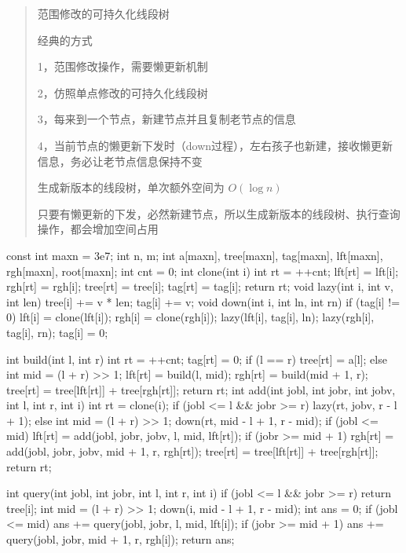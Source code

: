 \documentclass[UTF8,a4paper,11pt]{ctexart}
\newcommand{\topic}[1]{%
  \par\needspace{3\baselineskip}\vspace{0.45em}%
  \noindent{\bfseries\color{Primary}#1}\par\vspace{0.12em}%
}
\begin{document}
\topic{范围修改主席树}

\begin{quote}
范围修改的可持久化线段树\par
经典的方式\par
1，范围修改操作，需要懒更新机制\par
2，仿照单点修改的可持久化线段树\par
3，每来到一个节点，新建节点并且复制老节点的信息\par
4，当前节点的懒更新下发时（down过程），左右孩子也新建，接收懒更新信息，务必让老节点信息保持不变\par
生成新版本的线段树，单次额外空间为 $O(\log n)$\par
只要有懒更新的下发，必然新建节点，所以生成新版本的线段树、执行查询操作，都会增加空间占用\par
\end{quote}

\begin{CodeBlock}
const int maxn = 3e7;
int n, m;
int a[maxn], tree[maxn], tag[maxn], lft[maxn], rgh[maxn], root[maxn];
int cnt = 0;
int clone(int i) {
    int rt = ++cnt;
    lft[rt] = lft[i];
    rgh[rt] = rgh[i];
    tree[rt] = tree[i];
    tag[rt] = tag[i];
    return rt;
}
void lazy(int i, int v, int len) {
    tree[i] += v * len;
    tag[i] += v;
}
void down(int i, int ln, int rn) {
    if (tag[i] != 0) {
        lft[i] = clone(lft[i]);
        rgh[i] = clone(rgh[i]);
        lazy(lft[i], tag[i], ln);
        lazy(rgh[i], tag[i], rn);
        tag[i] = 0;
    }
}
\end{CodeBlock}

\begin{CodeBlock}
int build(int l, int r) {
    int rt = ++cnt;
    tag[rt] = 0;
    if (l == r) {
        tree[rt] = a[l];
    } else {
        int mid = (l + r) >> 1;
        lft[rt] = build(l, mid);
        rgh[rt] = build(mid + 1, r);
        tree[rt] = tree[lft[rt]] + tree[rgh[rt]];
    }
    return rt;
}
int add(int jobl, int jobr, int jobv, int l, int r, int i) {
    int rt = clone(i);
    if (jobl <= l && jobr >= r) {
        lazy(rt, jobv, r - l + 1);
    } else {
        int mid = (l + r) >> 1;
        down(rt, mid - l + 1, r - mid);
        if (jobl <= mid)
            lft[rt] = add(jobl, jobr, jobv, l, mid, lft[rt]);
        if (jobr >= mid + 1)
            rgh[rt] = add(jobl, jobr, jobv, mid + 1, r, rgh[rt]);
        tree[rt] = tree[lft[rt]] + tree[rgh[rt]];
    }
    return rt;
}
\end{CodeBlock}

\begin{CodeBlock}
int query(int jobl, int jobr, int l, int r, int i) {
    if (jobl <= l && jobr >= r)
        return tree[i];
    int mid = (l + r) >> 1;
    down(i, mid - l + 1, r - mid);
    int ans = 0;
    if (jobl <= mid)
        ans += query(jobl, jobr, l, mid, lft[i]);
    if (jobr >= mid + 1)
        ans += query(jobl, jobr, mid + 1, r, rgh[i]);
    return ans;
}
\end{CodeBlock}
\end{document}
